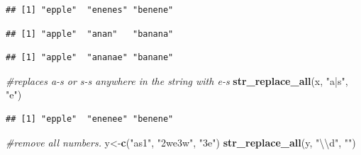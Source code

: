 \documentclass[]{book}
\newenvironment{Shaded}{\begin{snugshade}}{\end{snugshade}}
\newcommand{\KeywordTok}[1]{\textcolor[rgb]{0.13,0.29,0.53}{\textbf{#1}}}
\newcommand{\CharTok}[1]{\textcolor[rgb]{0.31,0.60,0.02}{#1}}
\newcommand{\StringTok}[1]{\textcolor[rgb]{0.31,0.60,0.02}{#1}}
\newcommand{\CommentTok}[1]{\textcolor[rgb]{0.56,0.35,0.01}{\textit{#1}}}
\newcommand{\NormalTok}[1]{#1}
\begin{document}
\begin{verbatim}
## [1] "epple"  "enenes" "benene"
\end{verbatim}

\begin{Shaded}
\end{Shaded}

\begin{verbatim}
## [1] "apple"  "anan"   "banana"
\end{verbatim}

\begin{Shaded}
\end{Shaded}

\begin{verbatim}
## [1] "apple"  "ananae" "banane"
\end{verbatim}

\begin{Shaded}
\begin{Highlighting}[]
\CommentTok{#replaces a-s or s-s anywhere in the string with e-s}
\KeywordTok{str_replace_all}\NormalTok{(x, }\StringTok{"a|s"}\NormalTok{, }\StringTok{"e"}\NormalTok{)}
\end{Highlighting}
\end{Shaded}

\begin{verbatim}
## [1] "epple"  "enenee" "benene"
\end{verbatim}

\begin{Shaded}
\begin{Highlighting}[]
\CommentTok{#remove all numbers. }
\NormalTok{y<-}\KeywordTok{c}\NormalTok{(}\StringTok{"as1"}\NormalTok{, }\StringTok{"2we3w"}\NormalTok{, }\StringTok{"3e"}\NormalTok{)}
\KeywordTok{str_replace_all}\NormalTok{(y, }\StringTok{"}\CharTok{\textbackslash{}\textbackslash{}}\StringTok{d"}\NormalTok{, }\StringTok{""}\NormalTok{) }
\end{Highlighting}
\end{Shaded}
\end{document}
